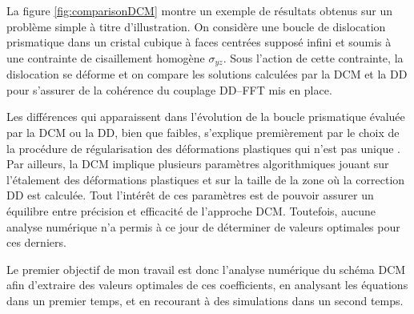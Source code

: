 La figure \ref{fig:comparisonDCM} montre un exemple de résultats obtenus sur un problème simple à titre d'illustration.
On considère une boucle de dislocation prismatique dans un cristal cubique à faces centrées supposé infini et soumis à une contrainte de cisaillement homogène $\sigma_{yz}$.
Sous l'action de cette contrainte, la dislocation se déforme et on compare les solutions calculées par la DCM et la DD pour s'assurer de la cohérence du couplage DD--FFT mis en place.

Les différences qui apparaissent dans l'évolution de la boucle prismatique évaluée par la DCM ou la DD, bien que faibles, s'explique premièrement par le choix de la procédure de régularisation des déformations plastiques qui n'est pas unique \cite{jamond2016_DCM,VATTRE2014,Capolungo2021}.
Par ailleurs, la DCM implique plusieurs paramètres algorithmiques jouant sur l'étalement des déformations plastiques et sur la taille de la zone où la correction DD est calculée.
Tout l'intérêt de ces paramètres est de pouvoir assurer un équilibre entre précision et efficacité de l'approche DCM.
Toutefois, aucune analyse numérique n'a permis à ce jour de déterminer de valeurs optimales pour ces derniers.

Le premier objectif de mon travail est donc l'analyse numérique du schéma DCM afin d'extraire des valeurs optimales de ces coefficients, en analysant les équations dans un premier temps, et en recourant à des simulations dans un second temps.



